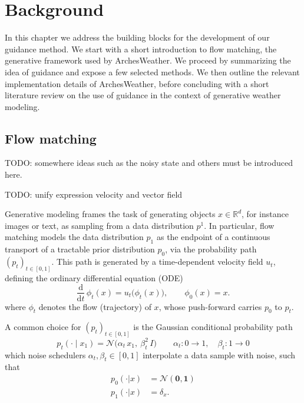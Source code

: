 \chapter{Background}

In this chapter we address the building blocks for the development of our guidance method.
We start with a short introduction to flow matching, the generative framework used by ArchesWeather.
We proceed by summarizing the idea of guidance and expose a few selected methods.
We then outline the relevant implementation details of ArchesWeather, before concluding with a short literature review on the use of guidance in the context of generative weather modeling. 

\section{Flow matching}

TODO: somewhere ideas such as the noisy state and others must be introduced here.

TODO: unify expression velocity and vector field 

Generative modeling frames the task of generating objects $x \in \mathbb{R}^d$, for instance images or text, as sampling from a data distribution $p^1$.
In particular, flow matching \parencite{lipman2023flow} models the data distribution $p_1$ as the endpoint of a
continuous transport of a tractable prior distribution $p_0$, via the probability path $(p_t)_{t\in[0,1]}$.
This path is generated by a time-dependent velocity field $u_t$, defining the ordinary differential equation (ODE)
$$
    \frac{\mathrm{d}}{\mathrm{d}t}\,\phi_t(x) = u_t\big(\phi_t(x)\big), \qquad \phi_0(x) = x.
$$
where $\phi_t$ denotes the flow (trajectory) of $x$, whose push-forward carries $p_0$ to $p_t$.

A common choice for $(p_t)_{t\in[0,1]}$ is the Gaussian conditional probability path
$$
    p_t(\cdot \mid x_1) = \mathcal{N}\!\big(\alpha_t\, x_1,\ \beta_t^{2}\, I\big) \qquad \alpha_t: 0 \rightarrow 1, \quad \beta_t: 1 \rightarrow 0
$$
which noise schedulers $\alpha_t, \beta_t \in [0,1]$ interpolate a data sample with noise, such that
\begin{align*}
    p_0(\cdot|x) &= \mathcal{N}(\mathbf{0}, \mathbf{1}) \\
    p_1(\cdot|x) &= \delta_x .
\end{align*}


